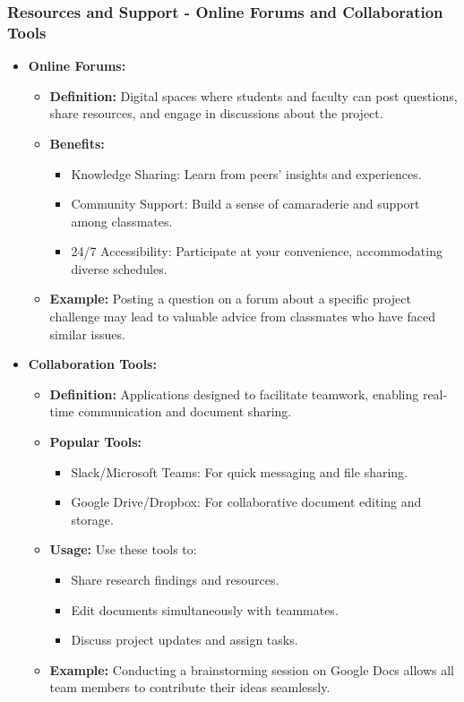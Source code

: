 \documentclass[aspectratio=169]{beamer}
\begin{document}
\begin{frame}[fragile]
    \frametitle{Resources and Support - Online Forums and Collaboration Tools}
    \begin{itemize}
        \item \textbf{Online Forums:}
            \begin{itemize}
                \item \textbf{Definition:} Digital spaces where students and faculty can post questions, share resources, and engage in discussions about the project.
                \item \textbf{Benefits:}
                    \begin{itemize}
                        \item Knowledge Sharing: Learn from peers' insights and experiences.
                        \item Community Support: Build a sense of camaraderie and support among classmates.
                        \item 24/7 Accessibility: Participate at your convenience, accommodating diverse schedules.
                    \end{itemize}
                \item \textbf{Example:} Posting a question on a forum about a specific project challenge may lead to valuable advice from classmates who have faced similar issues.
            \end{itemize}
        \item \textbf{Collaboration Tools:}
            \begin{itemize}
                \item \textbf{Definition:} Applications designed to facilitate teamwork, enabling real-time communication and document sharing.
                \item \textbf{Popular Tools:} 
                    \begin{itemize}
                        \item Slack/Microsoft Teams: For quick messaging and file sharing.
                        \item Google Drive/Dropbox: For collaborative document editing and storage.
                    \end{itemize}
                \item \textbf{Usage:} Use these tools to:
                    \begin{itemize}
                        \item Share research findings and resources.
                        \item Edit documents simultaneously with teammates.
                        \item Discuss project updates and assign tasks.
                    \end{itemize}
                \item \textbf{Example:} Conducting a brainstorming session on Google Docs allows all team members to contribute their ideas seamlessly.
            \end{itemize}
    \end{itemize}
\end{frame}
\end{document}
